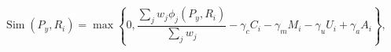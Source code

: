 \begin{equation}
\operatorname{Sim}(P_y,R_i)=\max\!\left\{0,
\frac{\sum_jw_j\phi_j(P_y,R_i)}{\sum_jw_j}
-\gamma_cC_i-\gamma_mM_i-\gamma_uU_i+\gamma_aA_i\right\},
\label{eq:predicate_rule_similarity}
\tag{7}
\end{equation}
